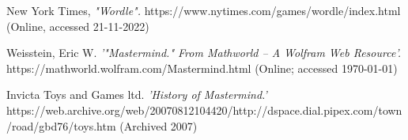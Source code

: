 \documentclass[11pt]{article}  %
\theoremstyle{definition}
\theoremstyle{remark}
\begin{document}
%
%
%
\begin{thebibliography}{99}

% 
%



%

%




New York Times,
{\em "Wordle".}
https://www.nytimes.com/games/wordle/index.html
(Online, accessed 21-11-2022)

Weisstein, Eric W.
{\em '"Mastermind." From Mathworld -- A Wolfram Web Resource'.}
https://mathworld.wolfram.com/Mastermind.html
(Online; accessed \today)

Invicta Toys and Games ltd.
{\em 'History of Mastermind.'}
https://web.archive.org/web/20070812104420/http://dspace.dial.pipex.com/town/road/gbd76/toys.htm
(Archived 2007)


\end{thebibliography}
\end{document}
